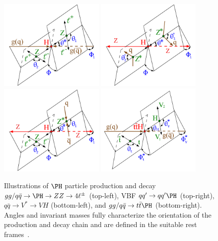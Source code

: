 \begin{figure}[!htb]
\begin{center}
\includegraphics[width=0.45\textwidth]{Figures/Observables/angles-h4l.pdf}
\includegraphics[width=0.45\textwidth]{Figures/Observables/angles-vbf.pdf}
\includegraphics[width=0.45\textwidth]{Figures/Observables/angles-vh.pdf}
\includegraphics[width=0.45\textwidth]{Figures/Observables/angles-tth1.pdf}
\caption
{ 
Illustrations of $\PH$ particle production and decay 
$gg/q\bar{q}\to \PH\to ZZ\to 4\ell^\pm$ (top-left),
VBF $q{q^\prime}\to q{q^\prime} \PH$ (top-right),
$q\bar{q}\to V^*\to VH$ (bottom-left), and
$gg/q\bar{q}\to t\bar{t} \PH$ (bottom-right).
Angles and invariant masses fully characterize the orientation of the production and decay chain and are defined 
in the suitable rest frames~\cite{Gao:2010qx,Anderson:2013afp,Gritsan:2016hjl}.
\label{fig:decay}
}
\end{center}
\end{figure}

